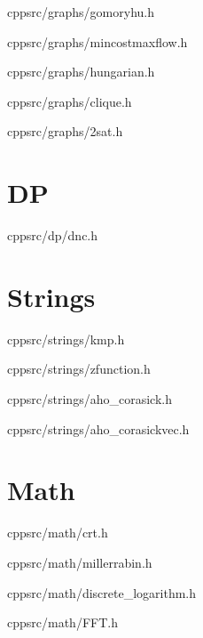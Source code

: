 \documentclass[portrait, 8pt, a4paper, oneside, twocolumn]{extarticle}
\begin{document}
    {}
    {}
    {cpp}{src/graphs/gomoryhu.h}
    \noindent\hrulefill

    {}
    {}
    {cpp}{src/graphs/mincostmaxflow.h}
    \noindent\hrulefill

    {}
    {}
    {cpp}{src/graphs/hungarian.h}
    \noindent\hrulefill

    {}
    {}
    {cpp}{src/graphs/clique.h}
    \noindent\hrulefill

    {}
    {}
    {cpp}{src/graphs/2sat.h}
    \noindent\hrulefill

\section{DP}
    {}
    {}
    {cpp}{src/dp/dnc.h}
    \noindent\hrulefill

\section{Strings}

    {}
    {}
    {cpp}{src/strings/kmp.h}
    \noindent\hrulefill

    {}
    {}
    {cpp}{src/strings/zfunction.h}
    \noindent\hrulefill

    {}
    {}
    {cpp}{src/strings/aho_corasick.h}
    \noindent\hrulefill

    {}
    {}
    {cpp}{src/strings/aho_corasickvec.h}
    \noindent\hrulefill

    
\section{Math}

    {}
    {}
    {cpp}{src/math/crt.h}
    \noindent\hrulefill

    {}
    {}
    {cpp}{src/math/millerrabin.h}
    \noindent\hrulefill

    {}
    {}
    {cpp}{src/math/discrete_logarithm.h}
    \noindent\hrulefill

    {}
    {}
    {cpp}{src/math/FFT.h}
    \noindent\hrulefill
    
\end{document}
